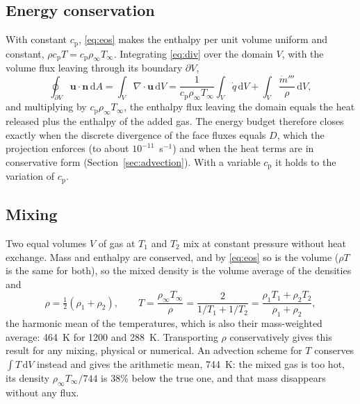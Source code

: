 \documentclass[11pt,a4paper]{article}
\newcommand{\vu}{\mathbf{u}}
\begin{document}
\subsection{Energy conservation}
With constant $c_\text{p}$, \eqref{eq:eos} makes the enthalpy per unit volume uniform and constant,
$\rho c_\text{p}T=c_\text{p}\rho_\infty T_\infty$. Integrating \eqref{eq:div} over the domain $V$, with the
volume flux leaving through its boundary $\partial V$,
\begin{equation}
  \oint_{\partial V}\vu\cdot\mathbf{n}\,\mathrm{d}A=\int_V\nabla\cdot\vu\,\mathrm{d}V
  =\frac{1}{c_\text{p}\rho_\infty T_\infty}\int_V\dot q\,\mathrm{d}V+\int_V\frac{\dot m'''}{\rho}\,\mathrm{d}V,
\end{equation}
and multiplying by $c_\text{p}\rho_\infty T_\infty$, the enthalpy flux leaving the domain equals the heat
released plus the enthalpy of the added gas. The energy budget therefore closes exactly when the discrete
divergence of the face fluxes equals $D$, which the projection enforces (to about $10^{-11}$~s$^{-1}$) and
when the heat terms are in conservative form (Section~\ref{sec:advection}). With a variable $c_\text{p}$ it
holds to the variation of $c_\text{p}$.

\subsection{Mixing}
Two equal volumes $V$ of gas at $T_1$ and $T_2$ mix at constant pressure without heat exchange. Mass
and enthalpy are conserved, and by \eqref{eq:eos} so is the volume ($\rho T$ is the same for both), so the
mixed density is the volume average of the densities and
\begin{equation}
  \rho=\tfrac12(\rho_1+\rho_2),\qquad
  T=\frac{\rho_\infty T_\infty}{\rho}=\frac{2}{1/T_1+1/T_2}=\frac{\rho_1T_1+\rho_2T_2}{\rho_1+\rho_2},
\end{equation}
the harmonic mean of the temperatures, which is also their mass-weighted average: 464~K for 1200 and
288~K. Transporting $\rho$ conservatively gives this result for any mixing, physical or numerical. An
advection scheme for $T$ conserves $\int T\,\mathrm{d}V$ instead and gives the arithmetic mean, 744~K: the
mixed gas is too hot, its density $\rho_\infty T_\infty/744$ is 38\% below the true one, and that mass
disappears without any flux.
\end{document}
